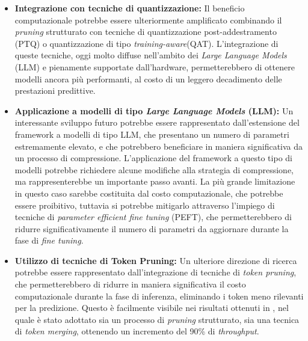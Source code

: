 \begin{itemize}
    \item \textbf{Integrazione con tecniche di quantizzazione:} Il beneficio computazionale potrebbe essere ulteriormente amplificato combinando il \textit{pruning} strutturato con tecniche di quantizzazione post-addestramento (PTQ) o quantizzazione di tipo \textit{training-aware}(QAT). L'integrazione di queste tecniche, oggi molto diffuse nell'ambito dei \textit{Large Language Models} (LLM) e pienamente supportate dall'hardware, permetterebbero di ottenere modelli ancora più performanti, al costo di un leggero decadimento delle prestazioni predittive.
    
    \item \textbf{Applicazione a modelli di tipo \textit{Large Language Models} (LLM):} Un interessante sviluppo futuro potrebbe essere rappresentato dall'estensione del framework a modelli di tipo LLM, che presentano un numero di parametri estremamente elevato, e che potrebbero beneficiare in maniera significativa da un processo di compressione. L'applicazione del framework a questo tipo di modelli potrebbe richiedere alcune modifiche alla strategia di compressione, ma rappresenterebbe un importante passo avanti. La più grande limitazione in questo caso sarebbe costituita dal costo computazionale, che potrebbe essere proibitivo, tuttavia si potrebbe mitigarlo attraverso l'impiego di tecniche di \textit{parameter efficient fine tuning} (PEFT), che permetterebbero di ridurre significativamente il numero di parametri da aggiornare durante la fase di \textit{fine tuning}.
    
    \item \textbf{Utilizzo di tecniche di Token Pruning:} Un ulteriore direzione di ricerca potrebbe essere rappresentato dall'integrazione di tecniche di \textit{token pruning}, che permetterebbero di ridurre in maniera significativa il costo computazionale durante la fase di inferenza, eliminando i token meno rilevanti per la predizione. Questo è facilmente visibile nei risultati ottenuti in \cite{wang2025caittriplewincompressionhigh}, nel quale è stato adottato sia un processo di \textit{pruning} strutturato, sia una tecnica di \textit{token merging}, ottenendo un incremento del 90\% di \textit{throughput}.
    
\end{itemize}


